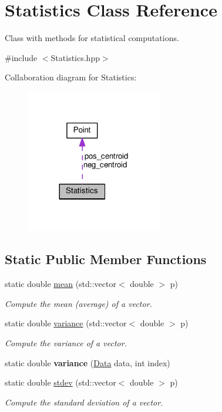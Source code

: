 \hypertarget{class_statistics}{}\section{Statistics Class Reference}
\label{class_statistics}


Class with methods for statistical computations.  




{\ttfamily \#include $<$Statistics.\+hpp$>$}



Collaboration diagram for Statistics\+:\nopagebreak
\begin{figure}[H]
\begin{center}
\leavevmode
\includegraphics[width=168pt]{class_statistics__coll__graph}
\end{center}
\end{figure}
\subsection*{Static Public Member Functions}
\begin{DoxyCompactItemize}
\item 
static double \hyperlink{class_statistics_ab121520f7556f75e295e04ff71f2af39}{mean} (std\+::vector$<$ double $>$ p)
\begin{DoxyCompactList}\small\item\em Compute the mean (average) of a vector. \end{DoxyCompactList}\item 
static double \hyperlink{class_statistics_af3a74e0ab944341356b8afeb9fc0ecbd}{variance} (std\+::vector$<$ double $>$ p)
\begin{DoxyCompactList}\small\item\em Compute the variance of a vector. \end{DoxyCompactList}\item 
\mbox{\label{class_statistics_a0390754b117a9b7a637b44992ed2ebf6}} 
static double {\bfseries variance} (\hyperlink{class_data}{Data} data, int index)
\item 
static double \hyperlink{class_statistics_a75435245095cd0fd54b2d57a6ae592da}{stdev} (std\+::vector$<$ double $>$ p)
\begin{DoxyCompactList}\small\item\em Compute the standard deviation of a vector. \end{DoxyCompactList}\end{DoxyCompactItemize}
